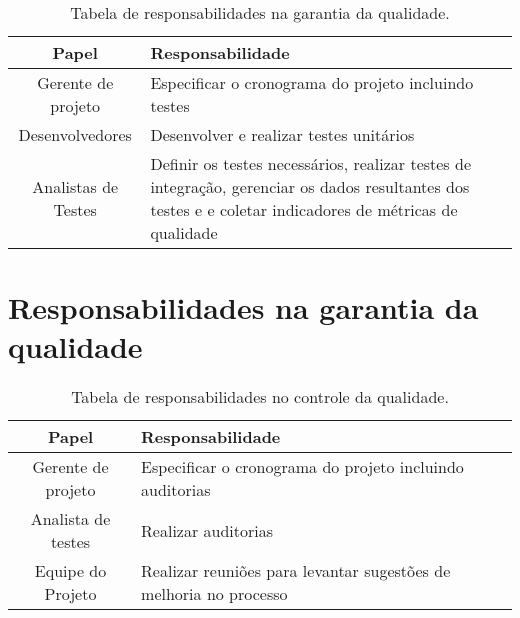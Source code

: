
\begin{table}[H]
	\begin{tabularx}{\textwidth}{| c | X |}
		\hline
		\textbf{Papel}      & \textbf{Responsabilidade}                                                                                                                                    \\
		\hline
		Gerente de projeto  & Especificar o cronograma do projeto incluindo testes                                                                                                         \\
		\hline
		Desenvolvedores     & Desenvolver e realizar testes unitários                                                                                                                     \\
		\hline
		Analistas de Testes & Definir os testes necessários, realizar testes de integração, gerenciar os dados resultantes dos testes e e coletar indicadores de métricas de qualidade \\
		\hline
	\end{tabularx}
	\centering
	\caption{Tabela de responsabilidades na garantia da qualidade.}
	\label{tab:responsability-quality-guarantee}
\end{table}

\section{Responsabilidades na garantia da qualidade}


\begin{table}[H]
	\begin{tabularx}{\textwidth}{| c | X |}
		\hline
		\textbf{Papel}     & \textbf{Responsabilidade}                                           \\
		\hline
		Gerente de projeto & Especificar o cronograma do projeto incluindo auditorias            \\
		\hline
		Analista de testes & Realizar auditorias                                                 \\
		\hline
		Equipe do Projeto  & Realizar reuniões para levantar sugestões de melhoria no processo \\
		\hline
	\end{tabularx}
	\centering
	\caption{Tabela de responsabilidades no controle da qualidade.}
	\label{tab:responsability-quality-control}
\end{table}

